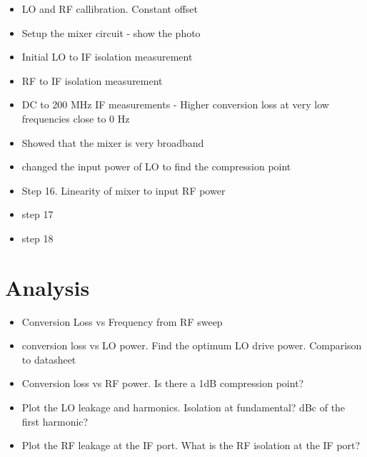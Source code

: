 \documentclass[twocolumn, aps, floatfix]{revtex4-1}
\begin{document}
\begin{itemize}
    \item LO and RF callibration. Constant offset

    \item Setup the mixer circuit - show the photo

    \item Initial LO to IF isolation measurement

    \item RF to IF isolation measurement

    \item DC to 200 MHz IF measurements - Higher conversion loss at very low frequencies close to 0 Hz

    \item Showed that the mixer is very broadband

    \item changed the input power of LO to find the compression point

    \item Step 16. Linearity of mixer to input RF power

    \item step 17

    \item step 18
    
\end{itemize}


\FloatBarrier
\section*{Analysis}

\begin{itemize}
    \item Conversion Loss vs Frequency from RF sweep

    \item conversion loss vs LO power. Find the optimum LO drive power. Comparison to datasheet

    \item Conversion loss vs RF power. Is there a 1dB compression point? 

    \item Plot the LO leakage and harmonics. Isolation at fundamental? dBc of the first harmonic?

    \item Plot the RF leakage at the IF port. What is the RF isolation at the IF port?
    
\end{itemize}
\end{document}
